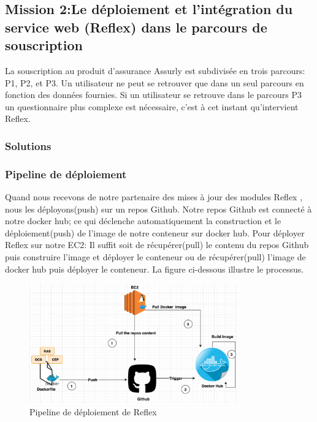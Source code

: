 \subsection{Mission 2:Le déploiement et l’intégration du service web (Reflex) dans le parcours de souscription}
La souscription au produit d’assurance Assurly est subdivisée en trois parcours: P1, P2, et P3. Un utilisateur ne peut se
retrouver que dans un seul parcours en fonction des données fournies. Si un utilisateur se retrouve dans le
parcours P3 un questionnaire plus complexe est nécessaire, c’est à cet instant qu’intervient Reflex.
\newpage
\subsubsection{Solutions}
\subsubsection{Pipeline de déploiement}
Quand nous recevons de notre partenaire des mises à jour des modules Reflex , nous les déployons(push) sur un repos Github. Notre repos Github est connecté à notre docker hub; ce qui déclenche automatiquement la construction et le déploiement(push) de l'image de notre conteneur sur docker hub. Pour déployer Reflex sur notre EC2: Il suffit soit de récupérer(pull) le contenu du repos Github puis construire l'image et déployer le conteneur ou de récupérer(pull) l'image de docker hub puis déployer le conteneur. La figure ci-dessous illustre le processus.  
 \begin{figure}[H]
            \centering
                \includegraphics[width=0.8\textwidth]{Figures/pipeline1}
	       \decoRule
		\caption[Pipeline de déploiement de Reflex]{Pipeline de déploiement de Reflex}
	\label{fig:Pipeline de déploiement de Reflex}
\end{figure}

